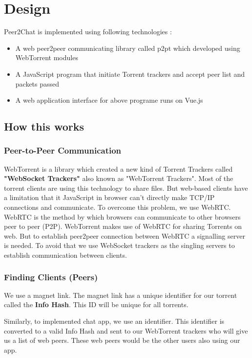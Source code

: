 \documentclass{fisatproject}
\begin{document}
\section{Design}

Peer2Chat is implemented using following technologies : 
  \begin{itemize}
 \item A web peer2peer communicating library called p2pt which developed using WebTorrent modules 
 \item A JavaScript program that initiate Torrent trackers and accept peer list and packets passed
 \item A web application interface for above programe runs on Vue.js 
 \end{itemize}

   \subsection{How this works}
   
    	\subsubsection{Peer-to-Peer Communication}
   WebTorrent is a library which created a new kind of Torrent Trackers called \textbf{"WebSocket Trackers"}  also known as "WebTorrent Trackers". Most of the torrent clients are using this technology to share files. But web-based  clients have a limitation that it  JavaScript in browser can't directly make TCP/IP connections and communicate. To overcome this problem, we use WebRTC. WebRTC is the method by which browsers can communicate to other browsers peer to peer (P2P). WebTorrent makes use of WebRTC for sharing Torrents on web. But to establish peer2peer connection between WebRTC a signalling server is needed. To avoid that we use WebSocket trackers as the singling servers to establish communication between clients.  
   		\subsubsection{Finding Clients (Peers)}
   		We use a magnet link. The magnet link has a unique identifier for our torrent called the \textbf{Info Hash}. This ID will be unique for all torrents.
   		
   		Similarly, to implemented chat app, we use an identifier. This identifier is converted to a valid Info Hash and sent to our WebTorrent trackers who will give us a list of web peers. These web peers would be the other users also using our app.
\end{document}
